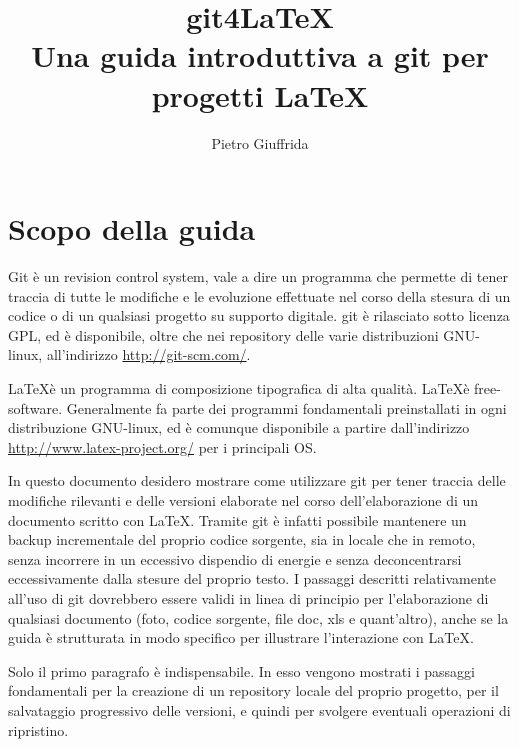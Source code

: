 \documentclass[a4paper,12pt,oneside]{article}
\begin{document}

\title{git4\LaTeX \\
  Una guida introduttiva a git per progetti \LaTeX}
\author{Pietro Giuffrida}
\maketitle
\newpage
\tableofcontents
\newpage
\large
\section{Scopo della guida}
Git è un revision control system, vale a dire un programma che permette di
tener traccia di tutte le modifiche e le evoluzione effettuate nel corso della
stesura di un codice o di un qualsiasi progetto su supporto digitale. git è
rilasciato sotto licenza GPL, ed è disponibile, oltre che nei repository delle
varie distribuzioni GNU-linux, all'indirizzo \url{http://git-scm.com/}.

\LaTeX è un programma di composizione tipografica di alta qualità. \LaTeX è
free-software. Generalmente fa parte dei programmi fondamentali preinstallati in
ogni distribuzione GNU-linux, ed è comunque disponibile a partire dall'indirizzo
\url{http://www.latex-project.org/} per i principali OS.

In questo documento desidero mostrare come utilizzare git per tener traccia
delle modifiche rilevanti e delle versioni elaborate nel corso dell'elaborazione
di un documento scritto con \LaTeX. Tramite git è infatti possibile mantenere un
backup incrementale del proprio codice sorgente, sia in locale che in remoto,
senza incorrere in un eccessivo dispendio di energie e senza deconcentrarsi
eccessivamente dalla stesure del proprio testo. I passaggi descritti
relativamente all'uso di git dovrebbero essere validi in linea di principio per
l'elaborazione di qualsiasi documento (foto, codice sorgente, file doc, xls
e quant'altro), anche se la guida è strutturata in modo specifico per
illustrare l'interazione con \LaTeX.

Solo il primo paragrafo è indispensabile. In esso vengono mostrati i passaggi
fondamentali per la creazione di un repository locale del proprio progetto, per
il salvataggio progressivo delle versioni, e quindi per svolgere eventuali
operazioni di ripristino.
\end{document}
